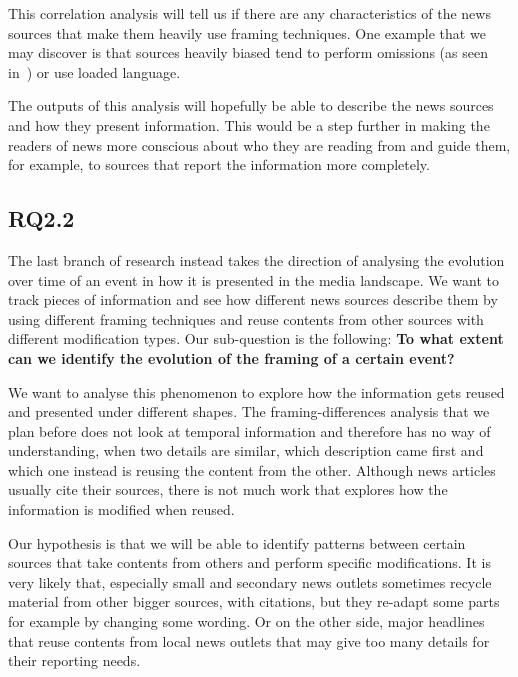 
This correlation analysis will tell us if there are any characteristics of the news sources that make them heavily use framing techniques.
One example that we may discover is that sources heavily biased tend to perform omissions (as seen in~\citet{bountouridis2018explaining}) or use loaded language.


The outputs of this analysis will hopefully be able to describe the news sources and how they present information.
This would be a step further in making the readers of news more conscious about who they are reading from and guide them, for example, to sources that report the information more completely.


\subsection{RQ2.2}
The last branch of research instead takes the direction of analysing the evolution over time of an event in how it is presented in the media landscape.
We want to track pieces of information and see how different news sources describe them by using different framing techniques and reuse contents from other sources with different modification types.
Our sub-question is the following: \textbf{To what extent can we identify the evolution of the framing of a certain event?}

We want to analyse this phenomenon to explore how the information gets reused and presented under different shapes.
The framing-differences analysis that we plan before does not look at temporal information and therefore has no way of understanding, when two details are similar, which description came first and which one instead is reusing the content from the other.
Although news articles usually cite their sources, there is not much work that explores how the information is modified when reused.


Our hypothesis is that we will be able to identify patterns between certain sources that take contents from others and perform specific modifications.
It is very likely that, especially small and secondary news outlets sometimes recycle material from other bigger sources, with citations, but they re-adapt some parts for example by changing some wording.
Or on the other side, major headlines that reuse contents from local news outlets that may give too many details for their reporting needs.


